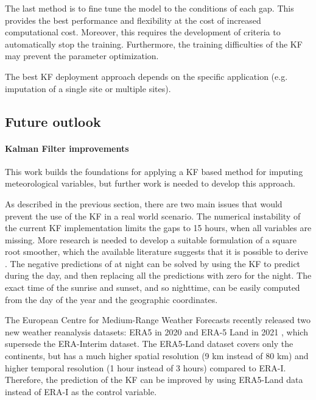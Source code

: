 \documentclass{article}
\let\Oldsubsection\subsection
\renewcommand{\subsection}{\FloatBarrier\Oldsubsection}
\begin{document}
The last method is to fine tune the model to the conditions of each gap. This provides the best performance and flexibility at the cost of increased computational cost. Moreover, this requires the development of criteria to automatically stop the training. Furthermore, the training difficulties of the KF may prevent the parameter optimization.

The best KF deployment approach depends on the specific application (e.g. imputation of a single site or multiple sites).

\subsection{Future outlook}

\paragraph{Kalman Filter improvements} This work builds the foundations for applying a KF based method for imputing meteorological variables, but further work is needed to develop this approach.

As described in the previous section, there are two main issues that would prevent the use of the KF in a real world scenario.
The numerical instability of the current KF implementation limits the gaps to 15 hours, when all variables are missing.
More research is needed to develop a suitable formulation of a square root smoother, which the available literature suggests that it is possible to derive \cite{rutten_square-root_2013, park_new_1996}.
The negative predictions of  at night can be solved by using the KF to predict  during the day, and then replacing all the predictions with zero for the night. The exact time of the sunrise and sunset, and so nighttime, can be easily computed from the day of the year and the geographic coordinates.

The European Centre for Medium-Range Weather Forecasts recently released two new weather reanalysis datasets: ERA5 in 2020 \cite{hersbach_era5_2020} and ERA-5 Land  in 2021 \cite{munoz-sabater_era5-land_2021}, which supersede the ERA-Interim dataset. The ERA5-Land dataset covers only the continents, but has a much higher spatial resolution (9 km instead of 80 km) and higher temporal resolution (1 hour instead of 3 hours) compared to ERA-I. Therefore, the prediction of the KF can be improved by using ERA5-Land data instead of ERA-I as the control variable.
\end{document}
